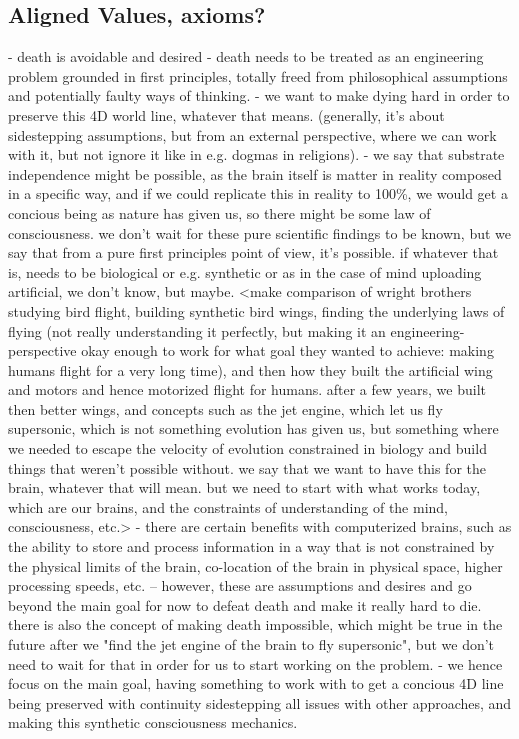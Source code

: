 \documentclass[10pt]{article}
\begin{document}
\begin{sloppypar}
  \subsection{Aligned Values, axioms?}
  \label{sec:aligned-values}


  - death is avoidable and desired
  - death needs to be treated as an engineering problem grounded in first principles, totally freed from philosophical assumptions and potentially faulty ways of thinking.
  - we want to make dying hard in order to preserve this 4D world line, whatever that means. (generally, it's about sidestepping assumptions, but from an external perspective, where we can work with it, but not ignore it like in e.g. dogmas in religions).
  - we say that substrate independence might be possible, as the brain itself is matter in reality composed in a specific way, and if we could replicate this in reality to 100\%, we would get a concious being as nature has given us, so there might be some law of consciousness. we don't wait for these pure scientific findings to be known, but we say that from a pure first principles point of view, it's possible. if whatever that is, needs to be biological or e.g. synthetic or as in the case of mind uploading artificial, we don't know, but maybe. <make comparison of wright brothers studying bird flight, building synthetic bird wings, finding the underlying laws of flying (not really understanding it perfectly, but making it an engineering-perspective okay enough to work for what goal they wanted to achieve: making humans flight for a very long time), and then how they built the artificial wing and motors and hence motorized flight for humans. after a few years, we built then better wings, and concepts such as the jet engine, which let us fly supersonic, which is not something evolution has given us, but something where we needed to escape the velocity of evolution constrained in biology and build things that weren't possible without. we say that we want to have this for the brain, whatever that will mean. but we need to start with what works today, which are our brains, and the constraints of understanding of the mind, consciousness, etc.>
  - there are certain benefits with computerized brains, such as the ability to store and process information in a way that is not constrained by the physical limits of the brain, co-location of the brain in physical space, higher processing speeds, etc. – however, these are assumptions and desires and go beyond the main goal for now to defeat death and make it really hard to die. there is also the concept of making death impossible, which might be true in the future after we "find the jet engine of the brain to fly supersonic", but we don't need to wait for that in order for us to start working on the problem.
  - we hence focus on the main goal, having something to work with to get a concious 4D line being preserved with continuity sidestepping all issues with other approaches, and making this synthetic consciousness mechanics.



\end{sloppypar}
\end{document}
